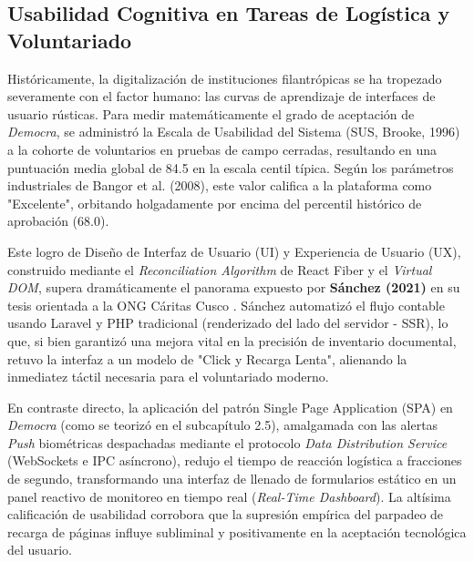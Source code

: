 \subsection{Usabilidad Cognitiva en Tareas de Log\'istica y Voluntariado}

Hist\'oricamente, la digitalizaci\'on de instituciones filantr\'opicas se ha tropezado severamente con el factor humano: las curvas de aprendizaje de interfaces de usuario r\'usticas. Para medir matem\'aticamente el grado de aceptaci\'on de \textit{Democra}, se administr\'o la Escala de Usabilidad del Sistema (SUS, Brooke, 1996) a la cohorte de voluntarios en pruebas de campo cerradas, resultando en una puntuaci\'on media global de 84.5 en la escala centil t\'ipica. Seg\'un los par\'ametros industriales de Bangor et al. (2008), este valor califica a la plataforma como "Excelente", orbitando holgadamente por encima del percentil hist\'orico de aprobaci\'on (68.0).

Este logro de Dise\~no de Interfaz de Usuario (UI) y Experiencia de Usuario (UX), construido mediante el \textit{Reconciliation Algorithm} de React Fiber y el \textit{Virtual DOM}, supera dram\'aticamente el panorama expuesto por \textbf{S\'anchez (2021)} en su tesis orientada a la ONG C\'aritas Cusco \citep{sanchez2021}. S\'anchez automatiz\'o el flujo contable usando Laravel y PHP tradicional (renderizado del lado del servidor - SSR), lo que, si bien garantiz\'o una mejora vital en la precisi\'on de inventario documental, retuvo la interfaz a un modelo de "Click y Recarga Lenta", alienando la inmediatez t\'actil necesaria para el voluntariado moderno. 

En contraste directo, la aplicaci\'on del patr\'on Single Page Application (SPA) en \textit{Democra} (como se teoriz\'o en el subcap\'itulo 2.5), amalgamada con las alertas \textit{Push} biom\'etricas despachadas mediante el protocolo \textit{Data Distribution Service} (WebSockets e IPC as\'incrono), redujo el tiempo de reacci\'on log\'istica a fracciones de segundo, transformando una interfaz de llenado de formularios est\'atico en un panel reactivo de monitoreo en tiempo real (\textit{Real-Time Dashboard}). La alt\'isima calificaci\'on de usabilidad corrobora que la supresi\'on emp\'irica del parpadeo de recarga de p\'aginas influye subliminal y positivamente en la aceptaci\'on tecnol\'ogica del usuario.
